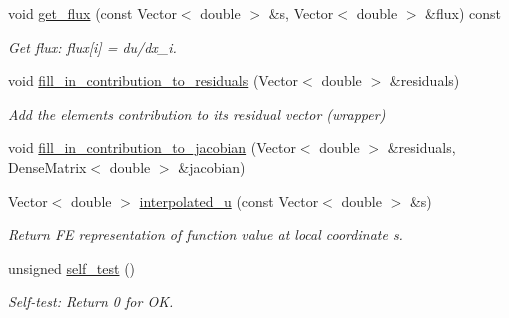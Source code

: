 \begin{DoxyCompactItemize}
\item 
void \hyperlink{classoomph_1_1MyBiharmonicEquations_a3178c1126ec2e6dec0bc3ff66af0b05e}{get\+\_\+flux} (const Vector$<$ double $>$ \&s, Vector$<$ double $>$ \&flux) const
\begin{DoxyCompactList}\small\item\em Get flux\+: flux\mbox{[}i\mbox{]} = du/dx\+\_\+i. \end{DoxyCompactList}\item 
void \hyperlink{classoomph_1_1MyBiharmonicEquations_a2f795bb316c3a9fc749639a8d3f8b5dd}{fill\+\_\+in\+\_\+contribution\+\_\+to\+\_\+residuals} (Vector$<$ double $>$ \&residuals)
\begin{DoxyCompactList}\small\item\em Add the element\textquotesingle{}s contribution to its residual vector (wrapper) \end{DoxyCompactList}\item 
void \hyperlink{classoomph_1_1MyBiharmonicEquations_ad5ef6af62c0ebf27bacf62be8d408c8a}{fill\+\_\+in\+\_\+contribution\+\_\+to\+\_\+jacobian} (Vector$<$ double $>$ \&residuals, Dense\+Matrix$<$ double $>$ \&jacobian)
\item 
Vector$<$ double $>$ \hyperlink{classoomph_1_1MyBiharmonicEquations_ae2de016426ddd5473e7ce32a629a040f}{interpolated\+\_\+u} (const Vector$<$ double $>$ \&s)
\begin{DoxyCompactList}\small\item\em Return FE representation of function value at local coordinate s. \end{DoxyCompactList}\item 
unsigned \hyperlink{classoomph_1_1MyBiharmonicEquations_a6898ff065e57f8e765440da81075cf3d}{self\+\_\+test} ()
\begin{DoxyCompactList}\small\item\em Self-\/test\+: Return 0 for OK. \end{DoxyCompactList}\end{DoxyCompactItemize}
